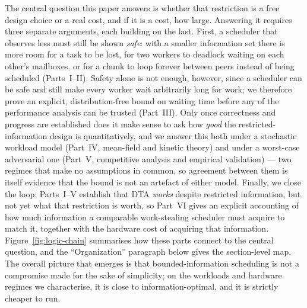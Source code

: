 \documentclass[11pt,a4paper]{article}
\begin{document}
The central question this paper answers is whether that restriction is a
free design choice or a real cost, and if it is a cost, how large. Answering
it requires three separate arguments, each building on the last. First, a
scheduler that observes less must still be shown \emph{safe}: with a
smaller information set there is more room for a task to be lost, for two
workers to deadlock waiting on each other's mailboxes, or for a chunk to
loop forever between peers instead of being scheduled (Parts~I--II).
Safety alone is not enough, however, since a scheduler can be safe and
still make every worker wait arbitrarily long for work; we therefore prove
an explicit, distribution-free bound on waiting time before any of the
performance analysis can be trusted (Part~III). Only once correctness and
progress are established does it make sense to ask how \emph{good} the
restricted-information design is quantitatively, and we answer this both
under a stochastic workload model (Part~IV, mean-field and kinetic theory)
and under a worst-case adversarial one (Part~V, competitive analysis and
empirical validation) --- two regimes that make no assumptions in common,
so agreement between them is itself evidence that the bound is not an
artefact of either model. Finally, we close the loop: Parts~I--V establish
that DTA \emph{works} despite restricted information, but not yet what
that restriction is worth, so Part~VI gives an explicit accounting of how
much information a comparable work-stealing scheduler must acquire to
match it, together with the hardware cost of acquiring that information.
Figure~\ref{fig:logic-chain} summarises how these parts connect to the
central question, and the ``Organization'' paragraph below gives the
section-level map. The overall picture that emerges is that bounded-information
scheduling is not a compromise made for the sake of simplicity; on the
workloads and hardware regimes we characterise, it is close to
information-optimal, and it is strictly cheaper to run.
\end{document}
